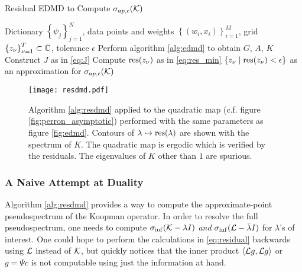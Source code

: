 \begin{algorithm}
    \caption{Residual EDMD to Compute $\sigma_{ap, \epsilon} (\mathcal{K})$}
    \label{alg:resdmd}
    \begin{algorithmic}[1]
        \Require Dictionary $\left\{ \psi_j \right\}_{j=1}^N$, 
            data points and weights $\left\{ (w_i, x_i) \right\}_{i=1}^M$, 
            grid $\left\{ z_\nu \right\}_{\nu=1}^T \subset \mathbb{C}$,
            tolerance $\epsilon$
        \State Perform algorithm \ref{alg:edmd} to obtain $G$, $A$, $K$
        \State Construct $J$ as in \ref{eq:J}
            \State Compute $\text{res} (z_\nu)$ as in \ref{eq:res_min}
        \EndFor
        \State \Return $\left\{ z_\nu \mid \text{res} (z_\nu) < \epsilon \right\}$
            as an approximation for $\sigma_{ap, \epsilon} (\mathcal{K})$
    \end{algorithmic}
\end{algorithm}

\begin{figure}
    \centering
    \texttt{[image: resdmd.pdf]}
    \caption{
        Algorithm \ref{alg:resdmd} applied to the quadratic map (c.f. figure 
        \ref{fig:perron_asymptotic}) performed with the same parameters as 
        figure \ref{fig:edmd}. Contours of $\lambda \mapsto \text{res} (\lambda)$ are shown with 
        the spectrum of $K$. The quadratic map is ergodic \cite{logisitc_ergodic} 
        which is verified by the residuals. The eigenvalues of $K$ other than $1$ 
        are spurious. 
    }\label{fig:resdmd}
\end{figure}


\subsubsection{A Naive Attempt at Duality}

Algorithm \ref{alg:resdmd} provides a way to compute the approximate-point pseudospectrum 
of the Koopman operator. In order to resolve the full pseudospectrum, one needs to compute 
$\sigma_{\inf} (\mathcal{K} - \lambda I)$ \emph{and} $\sigma_{\inf} (\mathcal{L} - \bar{\lambda} I)$ 
for $\lambda$'s of interest. One could hope to perform the calculations in \ref{eq:residual} 
backwards using $\mathcal{L}$ instead of $\mathcal{K}$, but quickly notices that the inner product 
$\left\langle \mathcal{L} g, \mathcal{L} g \right\rangle$ or $g = \Psi c$ is not computable using just 
the information at hand. 

